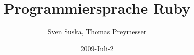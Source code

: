 \usepackage[german]{babel}
\usepackage[T1]{fontenc}
\usepackage[utf8x]{inputenc}

\usepackage{verbatim} 
\usepackage{listings} 





\title[Ruby]{Programmiersprache Ruby}
\author{Sven Suska, Thomas Preymesser}
\date{2009-Juli-2}

\newcommand{\bls}[1]{{\bf\lstinline{#1}}}
